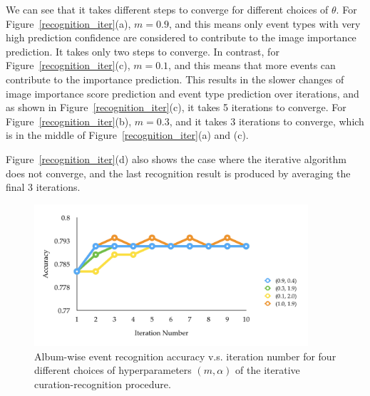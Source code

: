 \documentclass[runningheads]{llncs}
\begin{document}
We can see that it takes different steps to converge for different choices of $\theta$. For Figure~\ref{recognition_iter}(a), $m = 0.9$, and this means only event types with very high prediction confidence are considered to contribute to the image importance prediction. It takes only two steps to converge. In contrast, for Figure~\ref{recognition_iter}(c), $m=0.1$, and this means that more events can contribute to the importance prediction. This results in the slower changes of image importance score prediction and  event type prediction over iterations, and as shown in Figure~\ref{recognition_iter}(c), it takes 5 iterations to converge. For Figure~\ref{recognition_iter}(b), $m=0.3$, and it takes 3 iterations to converge, which is in the middle of Figure~\ref{recognition_iter}(a) and (c).

Figure~\ref{recognition_iter}(d) also shows the case where the iterative algorithm does not converge, and the last recognition result is produced by averaging the final 3 iterations.


\begin{figure}
\vspace{-0.1in}
\centering
\includegraphics[width=4in]{recognition_iterall}
\caption{Album-wise event recognition accuracy v.s. iteration number for four different choices of hyperparameters $ (m, \alpha)$ of the iterative curation-recognition procedure.}
\label{recognition_iterall}
\vspace{-0.2in}
\end{figure}
\end{document}
